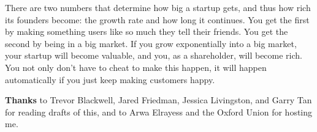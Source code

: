 There are two numbers that determine how big a startup gets, and thus
how rich its founders become: the growth rate and how long it continues.
You get the first by making something users like so much they tell their
friends. You get the second by being in a big market. If you grow
exponentially into a big market, your startup will become valuable, and
you, as a shareholder, will become rich. You not only don't have to
cheat to make this happen, it will happen automatically if you just keep
making customers happy.

\textbf{Thanks} to Trevor Blackwell, Jared Friedman, Jessica Livingston,
and Garry Tan for reading drafts of this, and to Arwa Elrayess and the
Oxford Union for hosting me.
